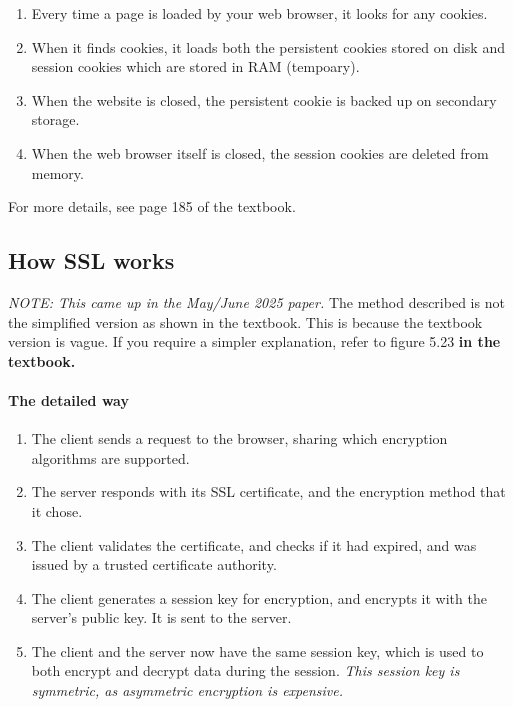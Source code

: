 \documentclass[../main.tex]{subfiles}
\begin{document}
\begin{enumerate}
    \item Every time a page is loaded by your web browser, it looks for any cookies.
    \item When it finds cookies, it loads both the persistent cookies stored on disk and session cookies which are stored in RAM (tempoary).
    \item When the website is closed, the persistent cookie is backed up on secondary storage.
    \item When the web browser itself is closed, the session cookies are deleted from memory.
\end{enumerate}

For more details, see page 185 of the textbook.

\subsection{How SSL works}
\label{5:sec:ssl}

\emph{NOTE: This came up in the May/June 2025 paper.} The method described is not the simplified version as shown in the textbook. This is because the textbook version is vague. If you require a simpler explanation, refer to figure 5.23 \textbf{in the textbook.}

\paragraph{The detailed way}

\begin{enumerate}
    \item The client sends a request to the browser, sharing which encryption algorithms are supported.
    \item The server responds with its SSL certificate, and the encryption method that it chose.
    \item The client validates the certificate, and checks if it had expired, and was issued by a trusted certificate authority.
    \item The client generates a session key for encryption, and encrypts it with the server's public key. It is sent to the server.
    \item The client and the server now have the same session key, which is used to both encrypt and decrypt data during the session. \emph{This session key is symmetric, as asymmetric encryption is expensive.}
\end{enumerate}
\end{document}
